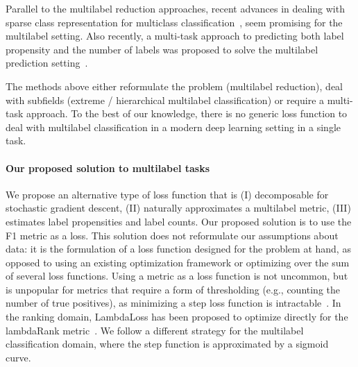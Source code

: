 Parallel to the multilabel reduction approaches, recent advances in dealing with sparse class representation for multiclass classification~\citep{focalLoss,tencent}, seem promising for the multilabel setting. Also recently, a multi-task approach to predicting both label propensity and the number of labels was proposed to solve the multilabel prediction setting~\cite{multitaskLabel}.

The methods above either reformulate the problem (multilabel reduction), deal with subfields (extreme / hierarchical multilabel classification) or require a multi-task approach. To the best of our knowledge, there is no generic loss function to deal with multilabel classification in a modern deep learning setting in a single task.



\paragraph{Our proposed solution to multilabel tasks}
We propose an alternative type of loss function that is (I) decomposable for stochastic gradient descent, (II) naturally approximates a multilabel metric, (III) estimates label propensities and label counts. Our proposed solution is to use the F1 metric as a loss. This solution does not reformulate our assumptions about data: it is the formulation of a loss function designed for the problem at hand, as opposed to using an existing optimization framework or optimizing over the sum of several loss functions.
Using a metric as a loss function is not uncommon, but is unpopular for metrics that require a form of thresholding (e.g., counting the number of true positives), as minimizing a step loss function is intractable~\cite{stochasticNegativeMining}. In the ranking domain, LambdaLoss has been proposed to optimize directly for the lambdaRank metric~\cite{lambdaLoss}. We follow a different strategy for the multilabel classification domain, where the step function is approximated by a sigmoid curve. 

